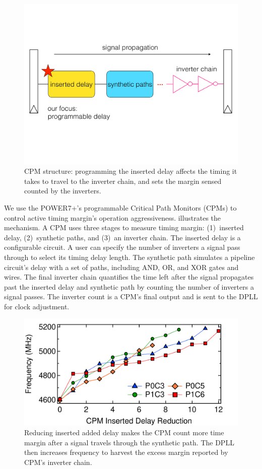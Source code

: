 \begin{figure}[t]
  \centering
  \includegraphics[trim=0 210 0 190,clip,width=0.8\linewidth]{graphs/process//cpm-struct.pdf}
  \caption{CPM structure: programming the inserted delay affects the timing it takes to travel to the inverter chain, and sets the margin sensed counted by the inverters.~\cite{drake2007distributed, drake2013single}
  \label{fig:cpm-struct}
  }
\end{figure}

We use the POWER7+'s programmable Critical Path Monitors (CPMs) to control active timing margin's operation aggressiveness.  illustrates the mechanism. A CPM uses three stages to measure timing margin: (1)~inserted delay, (2)~synthetic paths, and (3)~an inverter chain. The inserted delay is a configurable circuit. A user can specify the number of inverters a signal pass through to select its timing delay length. The synthetic path simulates a pipeline circuit's delay with a set of paths, including AND, OR, and XOR gates and wires. The final inverter chain quantifies the time left after the signal propagates past the inserted delay and synthetic path by counting the number of inverters a signal passes. The inverter count is a CPM's final output and is sent to the DPLL for clock adjustment.

\begin{figure}[t]
    \centering
    \includegraphics[trim=0 0 0 0,clip,width=.8\linewidth]{graphs/process//delay-freq.pdf}    
    \caption{Reducing inserted added delay makes the CPM count more time margin after a signal travels through the synthetic path. The DPLL then increases frequency to harvest the excess margin reported by CPM's inverter chain.}
    \label{fig:delay-freq}
\end{figure}

